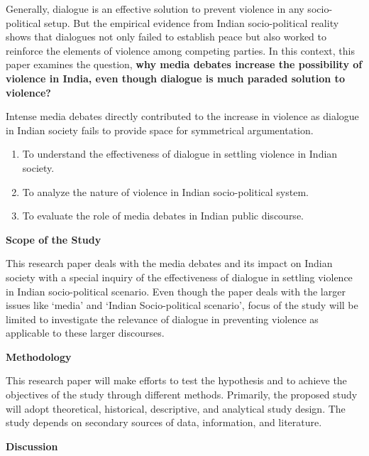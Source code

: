 \begin{multicols}{2}

\noi
Generally, dialogue is an effective solution to prevent violence in any socio-political setup. But
the empirical evidence from Indian socio-political reality shows that dialogues not only failed to
establish peace but also worked to reinforce the elements of violence among competing parties.
In this context, this paper examines the question, \textbf{why media debates increase the possibility of
violence in India, even though dialogue is much paraded solution to violence?}


\noi
Intense media debates directly contributed to the increase in violence as dialogue in Indian society
fails to provide space for symmetrical argumentation.


\begin{enumerate}[label=$\bullet$]
\item To understand the effectiveness of dialogue in settling violence in Indian society.

\item To analyze the nature of violence in Indian socio-political system.

\item To evaluate the role of media debates in Indian public discourse.
\end{enumerate}

\noi
{\normalsize\bfseries Scope of the Study}

\noi
This research paper deals with the media debates and its impact on Indian society with a special
inquiry of the effectiveness of dialogue in settling violence in Indian socio-political scenario.
Even though the paper deals with the larger issues like ‘media’ and ‘Indian Socio-political
scenario’, focus of the study will be limited to investigate the relevance of dialogue in preventing
violence as applicable to these larger discourses.

\noi
{\normalsize\bfseries Methodology}

\noi
This research paper will make efforts to test the hypothesis and to achieve the objectives of the
study through different methods. Primarily, the proposed study will adopt theoretical, historical,
descriptive, and analytical study design. The study depends on secondary sources of data,
information, and literature.

\noi
{\normalsize\bfseries Discussion}


\end{multicols}

